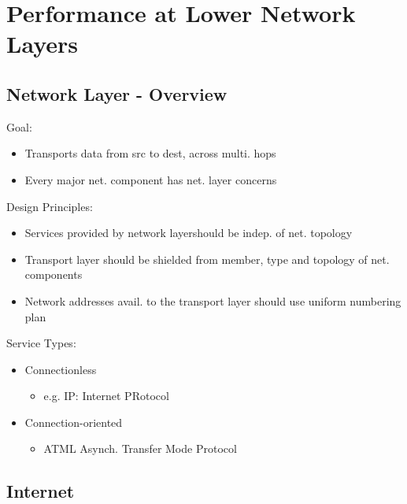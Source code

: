 \documentclass[a4paper]{article}
\begin{document}
\section{Performance at Lower Network Layers}
\subsection{Network Layer - Overview}
Goal:
\begin{itemize}
	\item Transports data from src to dest, across multi. hops
	\item Every major net. component has net. layer concerns
\end{itemize}
Design Principles:
\begin{itemize}
	\item Services provided by network layershould be indep. of net.
		topology
	\item Transport layer should be shielded from member, type and topology
		of net. components
	\item Network addresses avail. to the transport layer should use uniform
		numbering plan
\end{itemize}
Service Types:
\begin{itemize}
	\item Connectionless
	\begin{itemize}
		\item e.g. IP: Internet PRotocol
	\end{itemize}
	\item Connection-oriented
	\begin{itemize}
		\item ATML Asynch. Transfer Mode Protocol
	\end{itemize}
\end{itemize}
\subsection{Internet}
\end{document}
